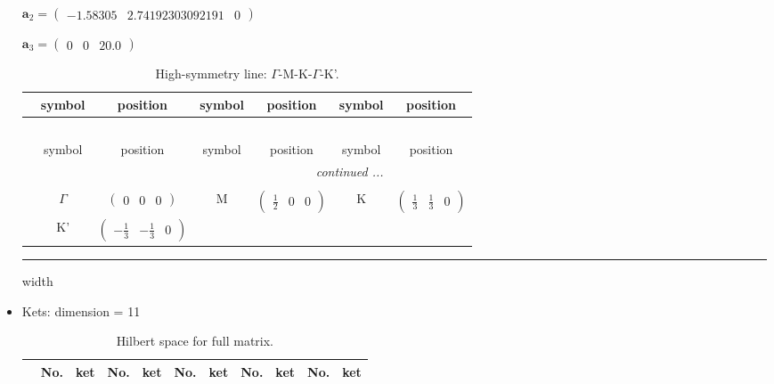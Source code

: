 \documentclass[fleqn,10pt,landscape]{article}
\begin{document}
\begin{itemize}
\quad $\bm{a}_2=\begin{pmatrix} -1.58305 & 2.74192303092191 & 0 \end{pmatrix}$

\quad $\bm{a}_3=\begin{pmatrix} 0 & 0 & 20.0 \end{pmatrix}$

\begin{center}
\renewcommand{\arraystretch}{1.3}
\begin{longtable}{c|cc|cc|cc}
\caption{High-symmetry line: $\Gamma$-M-K-$\Gamma$-K'.}
 \\
 \hline \hline
 & symbol & position & symbol & position & symbol & position \\ \hline \endfirsthead

\multicolumn{6}{l}{\tablename\ \thetable{}} \\
 \hline \hline
 & symbol & position & symbol & position & symbol & position \\ \hline \endhead

 \hline \hline
\multicolumn{6}{r}{\footnotesize\it continued ...} \\ \endfoot

 \hline \hline
\multicolumn{6}{r}{} \\ \endlastfoot

 & $\Gamma$ & $\begin{pmatrix} 0 & 0 & 0 \end{pmatrix}$ & M & $\begin{pmatrix} \frac{1}{2} & 0 & 0 \end{pmatrix}$ & K & $\begin{pmatrix} \frac{1}{3} & \frac{1}{3} & 0 \end{pmatrix}$ \\
& K' & $\begin{pmatrix} - \frac{1}{3} & - \frac{1}{3} & 0 \end{pmatrix}$ &  &  &  &  \\
\end{longtable}
\end{center}

 \hfil \hrule height 1mm width \textwidth \hfil

\item Kets: dimension = 11
\begin{center}
\renewcommand{\arraystretch}{1.3}
\begin{longtable}{c|cc|cc|cc|cc|cc}
\caption{Hilbert space for full matrix.}
 \\
 \hline \hline
 & No. & ket & No. & ket & No. & ket & No. & ket & No. & ket \\ \hline \endfirsthead


\end{longtable}
\end{center}
\end{itemize}
\end{document}
